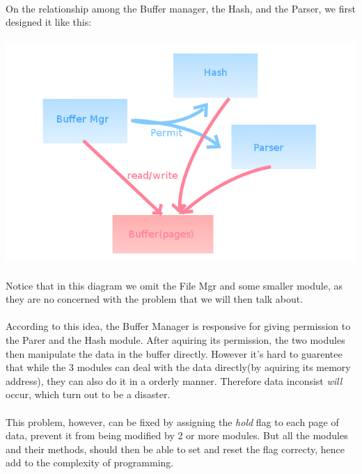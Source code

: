 \documentclass{article}
\begin{document}
        \paragraph{}
            On the relationship among the Buffer manager, the Hash, and the Parser, we first designed it like this:
        \paragraph{} \includegraphics[scale=0.5]{img/arch1.png}
        \paragraph{}
            Notice that in this diagram we omit the File Mgr and some smaller module, as they are no concerned with the problem that we will then talk about.
        \paragraph{}
            According to this idea, the Buffer Manager is responsive for giving permission to the Parer and the Hash module. After aquiring its permission, the two modules then manipulate the data in the buffer directly. However it's hard to guarentee that while the 3 modules can deal with the data directly(by aquiring its memory address), they can also do it in a orderly manner. Therefore data inconsist \emph{will} occur, which turn out to be a disaster.
        \paragraph{}
            This problem, however, can be fixed by assigning the \emph{hold} flag to each page of data, prevent it from being modified by 2 or more modules. But all the modules and their methods, should then be able to set and reset the flag correcty, hence add to the complexity of programming.
\end{document}
